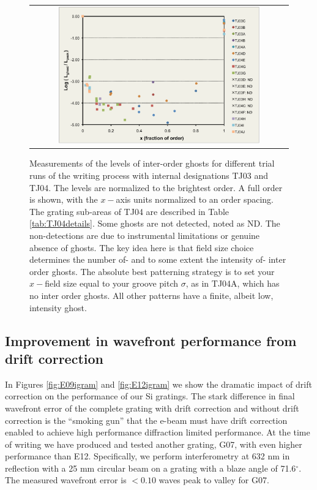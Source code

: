 \documentclass[]{spie}  %
\begin{document}
\begin{figure}
\begin{center}
 \begin{tabular}{c}
    \includegraphics[width=0.8\textwidth]{figs/TJ04_ghosts_pretty_alt.pdf}
   \end{tabular}
  \end{center}
  \caption[Ghost level measurements]{\label{fig:GhostLevelFig} Measurements of the levels of inter-order ghosts for different trial runs of the writing process with internal designations TJ03 and TJ04.  The levels are normalized to the brightest order.  A full order is shown, with the $x-$axis units normalized to an order spacing.  The grating sub-areas of TJ04 are described in Table \ref{tab:TJ04details}.  Some ghosts are not detected, noted as ND.  The non-detections are due to instrumental limitations or genuine absence of ghosts.  The key idea here is that field size choice determines the number of- and to some extent the intensity of- inter order ghosts.  The absolute best patterning strategy is to set your $x-$field size equal to your groove pitch $\sigma$, as in TJ04A, which has no inter order ghosts.  All other patterns have a finite, albeit low, intensity ghost.  }
\end{figure}


\subsection{Improvement in wavefront performance from drift correction}
In Figures \ref{fig:E09igram} and \ref{fig:E12igram} we show the dramatic impact of drift correction on the performance of our Si gratings.  The stark difference in final wavefront error of the complete grating with drift correction and without drift correction is the ``smoking gun'' that the e-beam must have drift correction enabled to achieve high performance diffraction limited performance.  At the time of writing we have produced and tested another grating, G07, with even higher performance than E12.  Specifically, we perform interferometry at 632 nm in reflection with a 25 mm circular beam on a grating with a blaze angle of 71.6$^\circ$.  The measured wavefront error is $<0.10$ waves peak to valley for G07.
\end{document}
